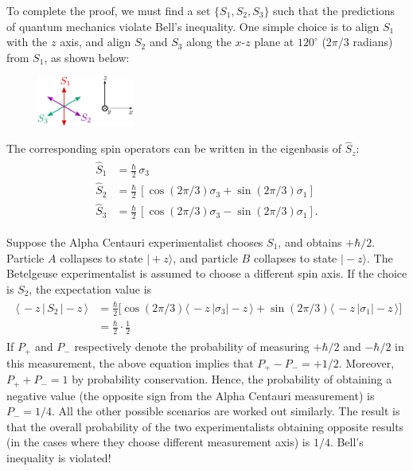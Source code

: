 \documentclass[pra,12pt]{revtex4}
\begin{document}
To complete the proof, we must find a set $\{S_1, S_2, S_3\}$ such
that the predictions of quantum mechanics violate Bell's inequality.
One simple choice is to align $S_1$ with the $z$ axis, and align $S_2$
and $S_3$ along the $x$-$z$ plane at $120^\circ$ ($2\pi/3$ radians)
from $S_1$, as shown below:

\begin{figure}[h]
  \centering\includegraphics[width=0.28\textwidth]{bellaxes}
\end{figure}

The corresponding spin operators can be written in the eigenbasis of
$\hat{S}_z$:
\begin{align}
  \begin{aligned}\hat{S}_1 &= \frac{\hbar}{2} \, \sigma_3 \\ \hat{S}_2 &= \frac{\hbar}{2} \, \left[\cos(2\pi/3) \sigma_3 + \sin(2\pi/3)\sigma_1\right]  \\   \hat{S}_3 &= \frac{\hbar}{2} \, \left[\cos(2\pi/3) \sigma_3 - \sin(2\pi/3)\sigma_1\right].\end{aligned}
\end{align}

Suppose the Alpha Centauri experimentalist chooses $S_1$, and obtains
$+\hbar/2$.  Particle $A$ collapses to state $|\!+\!z\rangle$, and
particle $B$ collapses to state $|\!-\!z\rangle$.  The Betelgeuse
experimentalist is assumed to choose a different spin axis.  If the
choice is $S_2$, the expectation value is
\begin{align}
  \begin{aligned}\langle\, - z \, | \, S_2 \,|-\!z\,\rangle &= \frac{\hbar}{2} \Big[\cos(2\pi/3) \langle\,- z\,|\sigma_3| - \!z\,\rangle + \sin(2\pi/3)\langle\,- z\,|\sigma_1|-\!z\,\rangle\Big]\\ &= \frac{\hbar}{2} \cdot \frac{1}{2} \end{aligned}
\end{align}
If $P_+$ and $P_-$ respectively denote the probability of measuring
$+\hbar/2$ and $-\hbar/2$ in this measurement, the above equation
implies that $P_+ - P_- = + 1/2$.  Moreover, $P_+ + P_- = 1$ by
probability conservation.  Hence, the probability of obtaining a
negative value (the opposite sign from the Alpha Centauri measurement)
is $P_- = 1/4$.  All the other possible scenarios are worked out
similarly.  The result is that the overall probability of the two
experimentalists obtaining opposite results (in the cases where they
choose different measurement axis) is $1/4$.  Bell's inequality is
violated!
\end{document}
